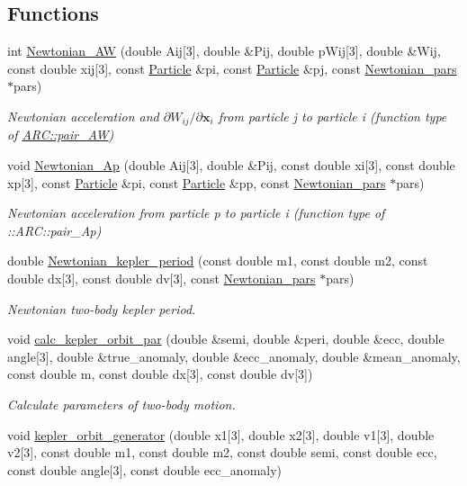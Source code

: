 \subsection*{Functions}
\begin{DoxyCompactItemize}
\item 
int \hyperlink{namespaceNTA_a831c3f8f362f34f1f987ee158e38c016}{Newtonian\+\_\+\+AW} (double Aij\mbox{[}3\mbox{]}, double \&Pij, double p\+Wij\mbox{[}3\mbox{]}, double \&Wij, const double xij\mbox{[}3\mbox{]}, const \hyperlink{classParticle}{Particle} \&pi, const \hyperlink{classParticle}{Particle} \&pj, const \hyperlink{classNTA_1_1Newtonian__pars}{Newtonian\+\_\+pars} $\ast$pars)
\begin{DoxyCompactList}\small\item\em Newtonian acceleration and $\partial W_{ij}/\partial \mathbf{x}_i$ from particle j to particle i (function type of \hyperlink{}{A\+R\+C\+::pair\+\_\+\+AW}) \end{DoxyCompactList}\item 
void \hyperlink{namespaceNTA_ac086c632a4f16eddc70f023f269d9c94}{Newtonian\+\_\+\+Ap} (double Aij\mbox{[}3\mbox{]}, double \&Pij, const double xi\mbox{[}3\mbox{]}, const double xp\mbox{[}3\mbox{]}, const \hyperlink{classParticle}{Particle} \&pi, const \hyperlink{classParticle}{Particle} \&pp, const \hyperlink{classNTA_1_1Newtonian__pars}{Newtonian\+\_\+pars} $\ast$pars)
\begin{DoxyCompactList}\small\item\em Newtonian acceleration from particle p to particle i (function type of \+::\+A\+R\+C\+::pair\+\_\+\+Ap) \end{DoxyCompactList}\item 
double \hyperlink{namespaceNTA_a387c8276183c856f55e73a719977d437}{Newtonian\+\_\+kepler\+\_\+period} (const double m1, const double m2, const double dx\mbox{[}3\mbox{]}, const double dv\mbox{[}3\mbox{]}, const \hyperlink{classNTA_1_1Newtonian__pars}{Newtonian\+\_\+pars} $\ast$pars)
\begin{DoxyCompactList}\small\item\em Newtonian two-\/body kepler period. \end{DoxyCompactList}\item 
void \hyperlink{namespaceNTA_a02d22f02e21004b264c8257a5ffbb600}{calc\+\_\+kepler\+\_\+orbit\+\_\+par} (double \&semi, double \&peri, double \&ecc, double angle\mbox{[}3\mbox{]}, double \&true\+\_\+anomaly, double \&ecc\+\_\+anomaly, double \&mean\+\_\+anomaly, const double m, const double dx\mbox{[}3\mbox{]}, const double dv\mbox{[}3\mbox{]})
\begin{DoxyCompactList}\small\item\em Calculate parameters of two-\/body motion. \end{DoxyCompactList}\item 
void \hyperlink{namespaceNTA_a621b3643cd91a5a7ea23b7b22481f121}{kepler\+\_\+orbit\+\_\+generator} (double x1\mbox{[}3\mbox{]}, double x2\mbox{[}3\mbox{]}, double v1\mbox{[}3\mbox{]}, double v2\mbox{[}3\mbox{]}, const double m1, const double m2, const double semi, const double ecc, const double angle\mbox{[}3\mbox{]}, const double ecc\+\_\+anomaly)
\end{DoxyCompactItemize}


